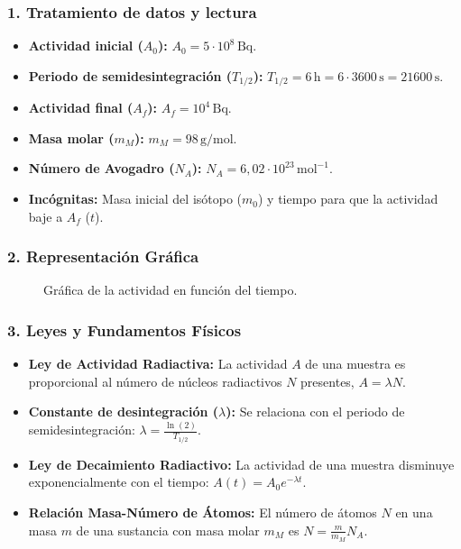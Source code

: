 \subsubsection*{1. Tratamiento de datos y lectura}
\begin{itemize}
    \item \textbf{Actividad inicial ($A_0$):} $A_0 = 5 \cdot 10^8\,\text{Bq}$.
    \item \textbf{Periodo de semidesintegración ($T_{1/2}$):} $T_{1/2} = 6\,\text{h} = 6 \cdot 3600\,\text{s} = 21600\,\text{s}$.
    \item \textbf{Actividad final ($A_f$):} $A_f = 10^4\,\text{Bq}$.
    \item \textbf{Masa molar ($m_M$):} $m_M = 98\,\text{g/mol}$.
    \item \textbf{Número de Avogadro ($N_A$):} $N_A = 6,02 \cdot 10^{23}\,\text{mol}^{-1}$.
    \item \textbf{Incógnitas:} Masa inicial del isótopo ($m_0$) y tiempo para que la actividad baje a $A_f$ ($t$).
\end{itemize}

\subsubsection*{2. Representación Gráfica}
\begin{figure}[H]
    \centering
    \caption{Gráfica de la actividad en función del tiempo.}
\end{figure}

\subsubsection*{3. Leyes y Fundamentos Físicos}
\begin{itemize}
    \item \textbf{Ley de Actividad Radiactiva:} La actividad $A$ de una muestra es proporcional al número de núcleos radiactivos $N$ presentes, $A = \lambda N$.
    \item \textbf{Constante de desintegración ($\lambda$):} Se relaciona con el periodo de semidesintegración: $\lambda = \frac{\ln(2)}{T_{1/2}}$.
    \item \textbf{Ley de Decaimiento Radiactivo:} La actividad de una muestra disminuye exponencialmente con el tiempo: $A(t) = A_0 e^{-\lambda t}$.
    \item \textbf{Relación Masa-Número de Átomos:} El número de átomos $N$ en una masa $m$ de una sustancia con masa molar $m_M$ es $N = \frac{m}{m_M} N_A$.
\end{itemize}

